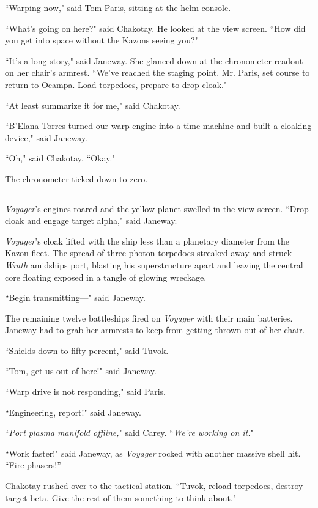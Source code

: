 \documentclass[twoside,letterpaper,12pt]{memoir}
\begin{document}
``Warping now," said Tom Paris, sitting at the helm console. 

``What's going on here?" said Chakotay. He looked at the view screen. ``How did you get into space without the Kazons seeing you?" 

``It's a long story," said Janeway. She glanced down at the chronometer readout on her chair's armrest. ``We've reached the staging point. Mr. Paris, set course to return to Ocampa. Load torpedoes, prepare to drop cloak." 

``At least summarize it for me," said Chakotay. 

``B'Elana Torres turned our warp engine into a time machine and built a cloaking device," said Janeway. 

``Oh," said Chakotay. ``Okay."

The chronometer ticked down to zero. 

\begin{center}\rule{3cm}{0.4 pt}\end{center} 

\textit{Voyager}'s engines roared and the yellow planet swelled in the view screen. ``Drop cloak and engage target alpha," said Janeway. 

\textit{Voyager}'s cloak lifted with the ship less than a planetary diameter from the Kazon fleet. The spread of three photon torpedoes streaked away and struck \textit{Wrath }amidships port, blasting his superstructure apart and leaving the central core floating exposed in a tangle of glowing wreckage. 

``Begin transmitting---" said Janeway. 

The remaining twelve battleships fired on \textit{Voyager} with their main batteries. Janeway had to grab her armrests to keep from getting thrown out of her chair. 

``Shields down to fifty percent," said Tuvok. 

``Tom, get us out of here!" said Janeway. 

``Warp drive is not responding," said Paris. 

``Engineering, report!" said Janeway. 

``\textit{Port plasma manifold offline,}" said Carey. ``\textit{We're working on it.}" 

``Work faster!" said Janeway, as \textit{Voyager} rocked with another massive shell hit. ``Fire phasers!” 

Chakotay rushed over to the tactical station. ``Tuvok, reload torpedoes, destroy target beta. Give the rest of them something to think about." 
\end{document}
